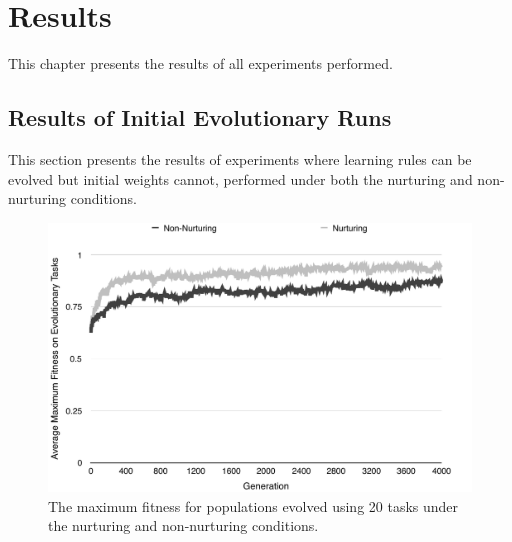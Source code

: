\documentclass[master]{outhesis}
\begin{document}
\chapter{Results}

This chapter presents the results of all experiments performed.

\section{Results of Initial Evolutionary Runs}

This section presents the results of experiments where learning rules can be evolved but initial weights cannot, performed under both the nurturing and non-nurturing conditions.

\begin{figure}[H]
	\centering
	\includegraphics{ChalmersEvolution.pdf}
	\caption{The maximum fitness for populations evolved using 20 tasks under the nurturing and non-nurturing conditions.}
	\label{fig:ChalmersEvolution}
\end{figure}

\end{document}

